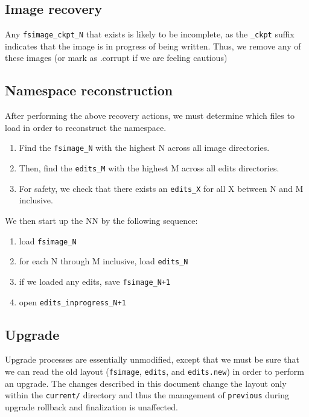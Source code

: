 \documentclass{article}
\begin{document}
\subsection{Image recovery}

Any {\tt fsimage\_ckpt\_N} that exists is likely to be incomplete, as the {\tt \_ckpt} suffix indicates that the image is in progress of being written. Thus, we remove any of these images (or mark as .corrupt if we are feeling cautious)

\subsection{Namespace reconstruction}
\label{ns-reconstruction}
After performing the above recovery actions, we must determine which files to load in order to reconstruct the namespace.

\begin{enumerate}
\item Find the {\tt fsimage\_N} with the highest N across all image directories.
\item Then, find the {\tt edits\_M} with the highest M across all edits directories.
\item For safety, we check that there exists an {\tt edits\_X} for all X between N and M inclusive.
\end{enumerate}

We then start up the NN by the following sequence:
\begin{enumerate}
\item load {\tt fsimage\_N}
\item for each N through M inclusive, load {\tt edits\_N}
\item if we loaded any edits, save {\tt fsimage\_N+1}
\item open {\tt edits\_inprogress\_N+1}
\end{enumerate}

\subsection{Upgrade}

Upgrade processes are essentially unmodified, except that we must be sure that we can read the old layout ({\tt fsimage}, {\tt edits}, and {\tt edits.new}) in order to perform an upgrade. The changes described in this document change the layout only within the {\tt current/} directory and thus the management of {\tt previous} during upgrade rollback and finalization is unaffected.
\end{document}
